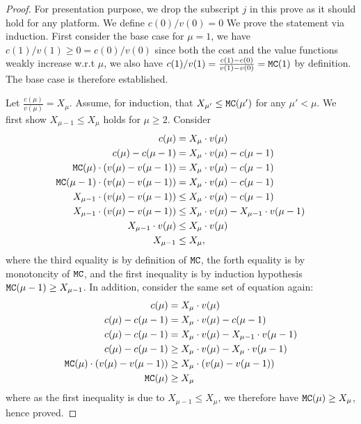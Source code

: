 \begin{proof}
For presentation purpose, we drop the subscript $j$ in this prove as it should hold for any platform. We define $c(0)/ v(0) = 0$ We prove the statement via induction. First consider the base case for $\mu = 1$, we have $c(1)/v(1) \geq 0 = c(0)/ v(0)$ since both the cost and the value functions weakly increase w.r.t $\mu$, we also have $c(1)/v(1) = \frac{c(1)- c(0)}{v(1) - v(0)} = \texttt{MC}(1)$ by definition. The base case is therefore established.

Let $\frac{c(\mu)}{v(\mu)} = X_{\mu}$. Assume, for induction, that $X_{\mu'} \leq \texttt{MC}(\mu')$ for any $\mu' < \mu$. We first show $X_{\mu-1} \leq X_{\mu}$ holds for $\mu\geq 2$. Consider
{\allowdisplaybreaks
\begin{align*}
     c(\mu) & = X_{\mu}\cdot v(\mu)\\
     c(\mu) - c(\mu-1) & =  X_{\mu}\cdot v(\mu) - c(\mu-1)\\
     \texttt{MC}(\mu) \cdot (v(\mu) - v(\mu-1)) & = X_{\mu}\cdot v(\mu) - c(\mu-1)\\
     \texttt{MC}(\mu-1) \cdot (v(\mu) - v(\mu-1)) & = X_{\mu}\cdot v(\mu) - c(\mu-1)\\
     X_{\mu-1}\cdot (v(\mu) - v(\mu-1)) &\leq X_{\mu}\cdot v(\mu) - c(\mu-1)\\
     X_{\mu-1}\cdot (v(\mu) - v(\mu-1)) &\leq X_{\mu}\cdot v(\mu) - X_{\mu-1} \cdot v(\mu-1)\\
     X_{\mu-1} \cdot v(\mu) & \leq X_{\mu}\cdot v(\mu)\\
     X_{\mu-1} &\leq X_{\mu},
\end{align*}}
where the third equality is by definition of $\texttt{MC}$, the forth equality is by monotoncity of $\texttt{MC}$, and the first inequality is by induction hypothesis $\texttt{MC}(\mu-1)\geq X_{\mu-1}$.
In addition, consider the same set of equation again:
{\allowdisplaybreaks\begin{align*}
     c(\mu) & = X_{\mu}\cdot v(\mu)\\
     c(\mu) - c(\mu-1) & =  X_{\mu}\cdot v(\mu) - c(\mu-1)\\
    c(\mu) - c(\mu-1) & = X_{\mu}\cdot v(\mu) - X_{\mu-1} \cdot v(\mu-1)\\
    c(\mu) - c(\mu-1) & \geq X_{\mu}\cdot v(\mu) - X_{\mu} \cdot v(\mu-1)\\
    \texttt{MC}(\mu) \cdot (v(\mu) - v(\mu-1))  & \geq X_\mu \cdot (v(\mu)-v(\mu-1))\\
    \texttt{MC}(\mu) & \geq X_\mu
\end{align*}}
where as the first inequality is due to $X_{\mu-1} \leq X_{\mu}$, we therefore have $\texttt{MC}(\mu) \geq X_\mu$, hence proved.
\end{proof}

